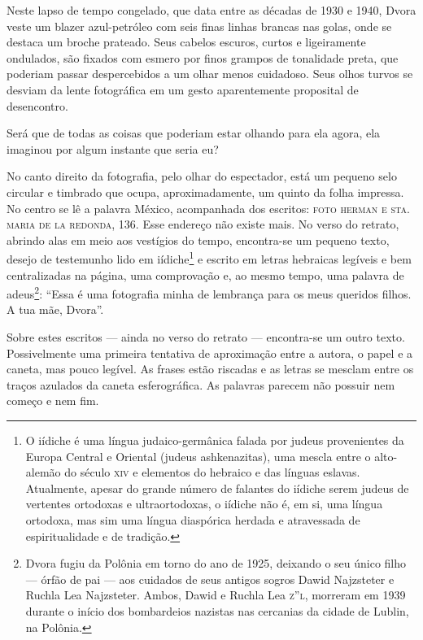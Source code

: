 Neste lapso de tempo congelado, que data entre as décadas de 1930 e
1940, Dvora veste um blazer azul-petróleo com seis finas linhas brancas
nas golas, onde se destaca um broche prateado. Seus cabelos escuros,
curtos e ligeiramente ondulados, são fixados com esmero por finos
grampos de tonalidade preta, que poderiam passar despercebidos a um
olhar menos cuidadoso. Seus olhos turvos se desviam da lente fotográfica
em um gesto aparentemente proposital de desencontro. 

Será que de todas as coisas que poderiam estar olhando para ela agora,
ela imaginou por algum instante que seria eu?

No canto direito da fotografia, pelo olhar do espectador, está um
pequeno selo circular e timbrado que ocupa, aproximadamente, um quinto da
folha impressa. No centro se lê a palavra México, acompanhada dos
escritos: \textsc{foto herman e sta. maria de la redonda}, 136. Esse endereço não
existe mais. No verso do retrato, abrindo alas em meio aos vestígios do
tempo, encontra-se um pequeno texto, desejo de testemunho lido em
iídiche\footnote{O iídiche é uma língua judaico-germânica
  falada por judeus provenientes da Europa Central e Oriental (judeus
  ashkenazitas), uma mescla entre o alto-alemão do século \textsc{xiv} e
  elementos do hebraico e das línguas eslavas. Atualmente, apesar do
  grande número de falantes do iídiche serem judeus de vertentes
  ortodoxas e ultraortodoxas, o iídiche não é, em si, uma língua
  ortodoxa, mas sim uma língua diaspórica herdada e atravessada de
  espiritualidade e de tradição.} e escrito em letras hebraicas legíveis
e bem centralizadas na página, uma comprovação e, ao mesmo tempo, uma
palavra de adeus\footnote{Dvora fugiu da Polônia em torno do ano de
  1925, deixando o seu único filho --- órfão de pai --- aos cuidados de
  seus antigos sogros Dawid Najzsteter e Ruchla Lea Najzsteter. Ambos,
  Dawid e Ruchla Lea \textsc{z''l}, morreram em 1939 durante o início dos
  bombardeios nazistas nas cercanias da cidade de Lublin, na Polônia.}:
``Essa é uma fotografia minha de lembrança para os meus queridos
filhos. A tua mãe, Dvora''.

Sobre estes escritos --- ainda no verso do retrato --- encontra-se um
outro texto. Possivelmente uma primeira tentativa de aproximação entre a
autora, o papel e a caneta, mas pouco legível. As frases estão riscadas
e as letras se mesclam entre os traços azulados da caneta esferográfica.
As palavras parecem não possuir nem começo e nem fim.


